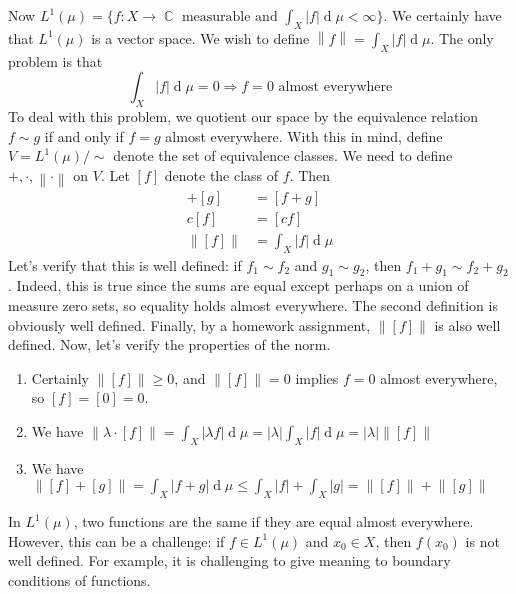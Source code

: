 \documentclass[12pt, a4paper]{book}
\DeclareMathOperator{\C}{\mathbb{C}}
\renewcommand{\d}[1]{\ensuremath{\operatorname{d}\!{#1}}} %
\newcommand{\norm}[1]{\left\lVert#1\right\rVert} %
\theoremstyle{nonumberplain}
\begin{document}
Now $L^1(\mu)=\{f:X\to\C\text{ measurable and }\int_X|f|\d{\mu}<\infty\}$.
We certainly have that $L^1(\mu)$ is a vector space.
We wish to define $\norm{f}=\int_X|f|\d{\mu}$.
The only problem is that
\[\int_X|f|\d{\mu}=0\Longrightarrow f=0\text{ almost everywhere}\]
To deal with this problem, we quotient our space by the equivalence relation $f\sim g$ if and only if $f=g$ almost everywhere.
With this in mind, define $V=L^1(\mu)/\sim$ denote the set of equivalence classes.
We need to define $+,\cdot,\norm{\cdot}$ on $V$.
Let $[f]$ denote the class of $f$.
Then
\begin{align*}
    [f]+[g]&=[f+g]\\
    c[f] &= [cf]\\
    \norm{[f]} &= \int_X|f|\d{\mu}
\end{align*}
Let's verify that this is well defined: if $f_1\sim f_2$ and $g_1\sim g_2$, then $f_1+g_1\sim f_2+g_2$.
Indeed, this is true since the sums are equal except perhaps on a union of measure zero sets, so equality holds almost everywhere.
The second definition is obviously well defined.
Finally, by a homework assignment, $\norm{[f]}$ is also well defined.
Now, let's verify the properties of the norm.
\begin{enumerate}[label=(\roman*)]
    \item Certainly $\norm{[f]}\geq 0$, and $\norm{[f]}=0$ implies $f=0$ almost everywhere, so $[f]=[0]=0$.
    \item We have $\norm{\lambda\cdot[f]}=\int_X|\lambda f|\d{\mu}=|\lambda|\int_X|f|\d{\mu}=|\lambda|\norm{[f]}$
    \item We have $\norm{[f]+[g]}=\int_X|f+g|\d{\mu}\leq\int_X|f|+\int_X|g|=\norm{[f]}+\norm{[g]}$
\end{enumerate}
In $L^1(\mu)$, two functions are the same if they are equal almost everywhere.
However, this can be a challenge: if $f\in L^1(\mu)$ and $x_0\in X$, then $f(x_0)$ is not well defined.
For example, it is challenging to give meaning to boundary conditions of functions.
\end{document}

